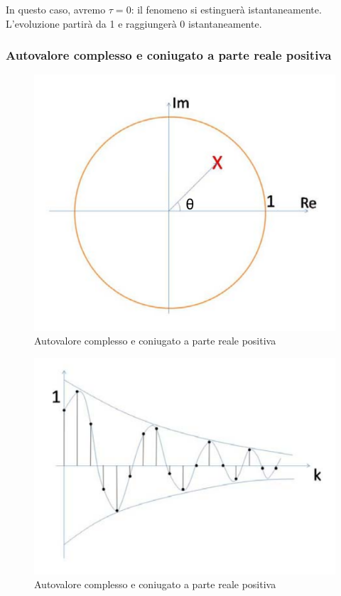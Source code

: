 \documentclass[a4paper]{report}
\begin{document}
In questo caso, avremo $\tau = 0$: il fenomeno si estinguer\`a
istantaneamente. L'evoluzione partir\`a da 1 e raggiunger\`a 0
istantaneamente.
  
\subsubsection{Autovalore complesso e coniugato a parte reale positiva}
\begin{figure}[!h]
  \begin{center}
    \includegraphics[scale=0.3]{./figures/autovaloreComplessoConiugatoRealePositivo00.png}
    \caption{Autovalore complesso e coniugato a parte reale
      positiva}\label{fig:autovaloreComplessoConiugatoRealePositivo00.png} 
  \end{center}
\end{figure}
\begin{figure}[!h]
  \begin{center}
    \includegraphics[scale=0.3]{./figures/autovaloreComplessoConiugatoRealePositivo01.png}
    \caption{Autovalore complesso e coniugato a parte reale
      positiva}\label{fig:autovaloreComplessoConiugatoRealePositivo01.png} 
  \end{center}
\end{figure}
\end{document}
